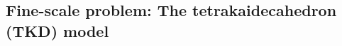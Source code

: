 \documentclass[preprint,3p,12pt,number,sort&compress]{elsarticle}
\def\vec   #1{\text{\boldmath $#1$}{}}
\def\ten   #1{\text{\boldmath $#1$}{}}
\def\rev #1{{\color{red}#1}}
\begin{document}


\subsection{Fine-scale problem: The tetrakaidecahedron (TKD) model}\label{sec:TKDmodel}
\end{document}
